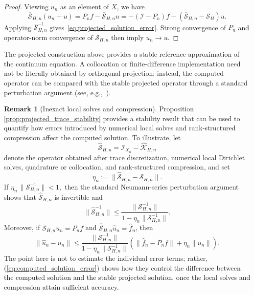 \documentclass[final,onefignum,onetabnum]{siamart250211}
\theoremstyle{definition}
\newtheorem{remark}{Remark}
\begin{document}
\begin{proof}
Viewing $u_n$ as an element of $X$, we have
\[
  \overline{\mathcal S}_{H,n}(u_n-u)
  =P_nf-\overline{\mathcal S}_{H,n}u
  =-(\mathcal I-P_n)f
   -(\overline{\mathcal S}_{H,n}-\mathcal S_H)u.
\]
Applying $\overline{\mathcal S}_{H,n}^{-1}$ gives~\eqref{eq:projected_solution_error}.  Strong convergence of $P_n$ and operator-norm convergence of $\overline{\mathcal S}_{H,n}$ then imply $u_n\to u$.
\end{proof}

The projected construction above provides a stable reference approximation of the continuum equation.  A collocation or finite-difference implementation need not be literally obtained by orthogonal projection; instead, the computed operator can be compared with the stable projected operator through a standard perturbation argument (see, e.g.,~\cite[Ch.~3-4]{atkinson1997}).

\begin{remark}[Inexact local solves and compression]
\label{rem:inexact_local_solves}
Proposition \ref{prop:projected_trace_stability} provides a stability result that can be
used to quantify how errors introduced by numerical local solves and rank-structured compression affect the computed solution. To illustrate, let
\[
  \widehat{\mathcal S}_{H,n}
  =\mathcal I_{X_n}-\widehat{\mathcal K}_{H,n}
\]
denote the operator obtained after trace discretization, numerical local Dirichlet solves, quadrature or collocation, and rank-structured compression, and set
\[
  \eta_n
  :=\|\widehat{\mathcal S}_{H,n}-\mathcal S_{H,n}\|.
\]
If
$
  \eta_n\,\|\mathcal S_{H,n}^{-1}\|<1,
$
then the standard Neumann-series perturbation argument shows that $\widehat{\mathcal S}_{H,n}$ is invertible and
\begin{equation}
  \|\widehat{\mathcal S}_{H,n}^{-1}\|
  \le
  \frac{\|\mathcal S_{H,n}^{-1}\|}
  {1-\eta_n\|\mathcal S_{H,n}^{-1}\|}.
  \label{eq:computed_inverse_bound}
\end{equation}
Moreover, if
$\mathcal S_{H,n}u_n=P_nf$
and
$\widehat{\mathcal S}_{H,n}\widehat u_n=\widehat f_n$,
then
\begin{equation}
  \|\widehat u_n-u_n\|
  \le
  \frac{\|\mathcal S_{H,n}^{-1}\|}
  {1-\eta_n\|\mathcal S_{H,n}^{-1}\|}
  \left(
    \|\widehat f_n-P_nf\|+\eta_n\|u_n\|
  \right).
  \label{eq:computed_solution_error}
\end{equation}
The point here is not to estimate the individual error terms; rather, (\ref{eq:computed_solution_error}) shows how they control the difference between the computed solution and the stable projected solution, once the local solves and compression attain sufficient accuracy.
\end{remark}
\end{document}
